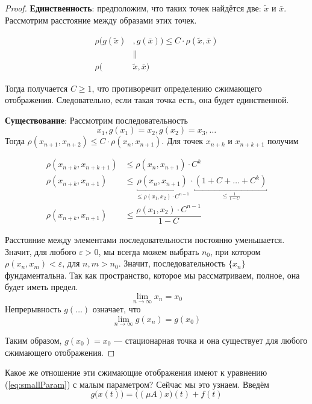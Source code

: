 \documentclass[12pt]{article}
\begin{document}
		\begin{proof}
			\textbf{Единственность}: предположим, что таких точек найдётся две: $\tilde{x}$ и $\bar{x}$. Рассмотрим 
			расстояние между образами этих точек.
		
			\begin{align*}
				\rho(g(\tilde{x})&, g(\bar{x})) \leq C \cdot \rho(\tilde{x}, \bar{x}) \\
				&\parallel \\
				\rho(&\tilde{x}, \bar{x})
			\end{align*}
		
			Тогда получается $C \geq 1$, что противоречит определению сжимающего отображения. Следовательно, если такая точка есть, она
			будет единственной.
		
			\textbf{Существование}: Рассмотрим последовательность 
			$$x_1, g(x_1) = x_2, g(x_2) = x_3, \ldots$$
			Тогда $\rho(x_{n+1},x_{n+2}) \leq C \cdot \rho(x_n, x_{n+1})$. Для точек $x_{n+k}$ и $x_{n+k+1}$ получим
		
			\begin{align*}
				\rho(x_{n+k},x_{n+k+1}) &\leq \rho(x_n, x_{n+1}) \cdot C^k \\
				\rho(x_{n+k},x_{n+1}) &\leq \underbracket{\rho(x_n, x_{n+1})}_{\leq \rho(x_1, x_2)\cdot C^{n-1}} 
				\cdot \underbracket{(1 + C + \ldots + C^k)}_{\leq \frac{1	}{1-C}} \\
				\rho(x_{n+k},x_{n+1}) &\leq \dfrac{\rho(x_1, x_2)\cdot C^{n-1}}{1-C}
			\end{align*}
		
			Расстояние между элементами последовательности постоянно уменьшается. Значит, для любого $\varepsilon > 0$, мы 
			всегда можем выбрать $n_0$, при котором $\rho(x_n, x_m) < \varepsilon$, для $n,m > n_0$. Значит, последовательность
			$\{x_n\}$ фундаментальна. Так как пространство, которое мы рассматриваем, полное, она будет иметь предел.		
			$$\underset{n \rightarrow \infty}{\lim} x_n = x_0$$		
			Непрерывность $g(\ldots)$ означает, что 
			$$\underset{n \rightarrow \infty}{\lim} g(x_n) = g(x_0)$$
		
			Таким образом, $g(x_0) = x_0$ --- стационарная точка и она существует для любого сжимающего отображения.
		\end{proof}
	
		Какое же отношение эти сжимающие отображения имеют к уравнению (\ref{eq:smallParam}) с малым параметром? 
		Сейчас мы это узнаем. Введём 
		\begin{equation}
			g\big(x(t)\big) = \big((\mu A)x\big)(t) + f(t) \label{eq:compactingFunction}
		\end{equation}
	
\end{document}

